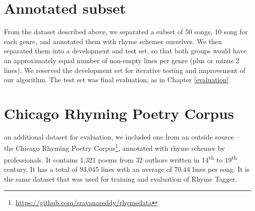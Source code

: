 \section{Annotated subset}
From the dataset described above, we separated a subset of 50 songs, 10 song for each genre, and annotated them with rhyme schemes ourselves. We then separated them into a development and test set, so that both groups would have an approximately equal number of non-empty lines per genre (plus or minus 2 lines). We reserved the development set for iterative testing and improvement of our algorithm. The test set was  final evaluation, as  in Chapter \ref{evaluation}.

\section{Chicago Rhyming Poetry Corpus}
 an additional dataset for evaluation, we included one from an outside source -- the Chicago Rhyming Poetry Corpus\footnote{\url{https://github.com/sravanareddy/rhymedata}}, annotated with rhyme schemes by professionals. It contains 1,321 poems from 32 authors written in 14\textsuperscript{th} to 19\textsuperscript{th} century. It has a total of 93,045 lines with an average of 70.44 lines per song. It is the same dataset that was used for training and evaluation of Rhyme Tagger.



